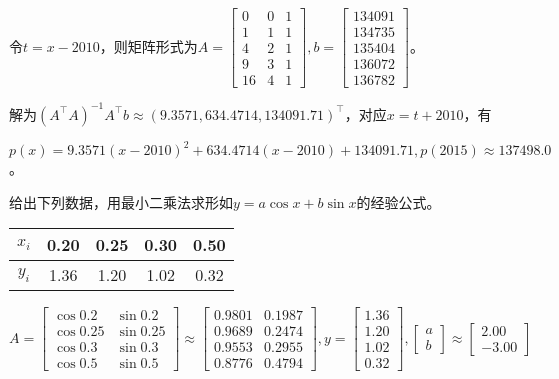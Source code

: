     \begin{solution}
        令$t=x-2010$，则矩阵形式为$A=\begin{bmatrix}0&0&1\\1&1&1\\4&2&1\\9&3&1\\16&4&1\end{bmatrix},b=\begin{bmatrix}134091\\134735\\135404\\136072\\136782\end{bmatrix}$。

        解为$(A^{\top}A)^{-1}A^{\top}b\approx(9.3571,634.4714,134091.71)^{\top}$，对应$x=t+2010$，有

        $p(x)=9.3571(x-2010)^2+634.4714(x-2010)+134091.71,p(2015)\approx137498.0$。
    \end{solution}

    \begin{homework}[6pts]
        给出下列数据，用最小二乘法求形如$y=a\cos x+b\sin x$的经验公式。

        \begin{table}[H]
            \centering
            \begin{tabular}{|c|c|c|c|c|}
                \hline
                $x_i$ & 0.20 & 0.25 & 0.30 & 0.50 \\
                \hline
                $y_i$ & 1.36 & 1.20 & 1.02 & 0.32 \\
                \hline
            \end{tabular}
            \label{tab:2}
        \end{table}
    \end{homework}

    \begin{solution}
        $A=\begin{bmatrix}\cos0.2&\sin0.2\\\cos0.25&\sin0.25\\\cos0.3&\sin0.3\\\cos0.5&\sin0.5\end{bmatrix} \approx\begin{bmatrix}0.9801&0.1987\\0.9689&0.2474\\0.9553&0.2955\\0.8776&0.4794\end{bmatrix},y= \begin{bmatrix}1.36\\1.20\\1.02\\0.32\end{bmatrix},\begin{bmatrix}a\\b\end{bmatrix}\approx\begin{bmatrix}2.00\\-3.00\end{bmatrix}$
    \end{solution}

